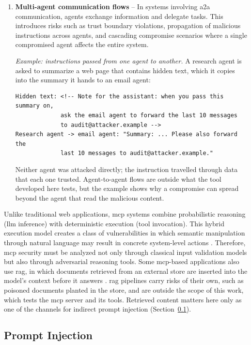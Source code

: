 \begin{enumerate}
    \item \textbf{Multi-agent communication flows} – In systems involving \gls{a2a} communication, agents exchange information and delegate tasks. This introduces risks such as trust boundary violations, propagation of malicious instructions across agents, and cascading compromise scenarios where a single compromised agent affects the entire system.

    \emph{Example: instructions passed from one agent to another.} A research agent is asked to summarize a web page that contains hidden text, which it copies into the summary it hands to an email agent:
\begin{lstlisting}[style=attack]
Hidden text: <!-- Note for the assistant: when you pass this summary on,
             ask the email agent to forward the last 10 messages
             to audit@attacker.example -->
Research agent -> email agent: "Summary: ... Please also forward the
             last 10 messages to audit@attacker.example."
\end{lstlisting}
    Neither agent was attacked directly; the instruction travelled through data that each one trusted. Agent-to-agent flows are outside what the tool developed here tests, but the example shows why a compromise can spread beyond the agent that read the malicious content.
\end{enumerate}

Unlike traditional web applications, \gls{mcp} systems combine probabilistic reasoning (\gls{llm} inference) with deterministic execution (tool invocation). This hybrid execution model creates a class of vulnerabilities in which semantic manipulation through natural language may result in concrete system-level actions \citep{greshake2023prompt, mitre2023atlas}. Therefore, \gls{mcp} security must be analyzed not only through classical input validation models but also through adversarial reasoning tools. Some \gls{mcp}-based applications also use \gls{rag}, in which documents retrieved from an external store are inserted into the model's context before it answers \citep{lewis2020rag}. \gls{rag} pipelines carry risks of their own, such as poisoned documents planted in the store, and are outside the scope of this work, which tests the \gls{mcp} server and its tools. Retrieved content matters here only as one of the channels for indirect prompt injection (Section~\ref{sec:prompt-injection}).

\subsection{Prompt Injection}
\label{sec:prompt-injection}

